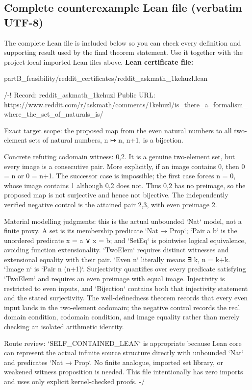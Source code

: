 \documentclass[11pt]{article}
\begin{document}
\subsection*{Complete counterexample Lean file (verbatim UTF-8)}
The complete Lean file is included below so you can check every definition and supporting result used by the final theorem statement. Use it together with the project-local imported Lean files above.
\textbf{Lean certificate file:}
\begin{Vsrc}
partB_feasibility/reddit_certificates/reddit_askmath_1kehuzl.lean
\end{Vsrc}
\begin{Vlean}
/-!
Record: reddit_askmath_1kehuzl
Public URL:
https://www.reddit.com/r/askmath/comments/1kehuzl/is_there_a_formalism_where_the_set_of_naturals_is/

Exact target scope: the proposed map from the even natural numbers to all
two-element sets of natural numbers, n ↦ {n, n+1}, is a bijection.

Concrete refuting codomain witness: {0,2}.  It is a genuine two-element set,
but every image is a consecutive pair.  More explicitly, if an image contains
0, then 0 = n or 0 = n+1.  The successor case is impossible; the first case
forces n = 0, whose image contains 1 although {0,2} does not.  Thus {0,2} has
no preimage, so the proposed map is not surjective and hence not bijective.
The independently verified negative control is the attained pair {2,3}, with
even preimage 2.

Material modelling judgments: this is the actual unbounded `Nat` model, not a
finite proxy.  A set is its membership predicate `Nat → Prop`; `Pair a b`
is the unordered predicate x = a ∨ x = b; and `SetEq` is pointwise logical
equivalence, avoiding function extensionality.  `TwoElem` requires distinct
witnesses and extensional equality with their pair.  `Even n` literally means
∃ k, n = k+k.  `Image n` is `Pair n (n+1)`.  Surjectivity quantifies over
every predicate satisfying `TwoElem` and requires an even preimage with equal
image.  Injectivity is restricted to even inputs, and `Bijection` contains both
that injectivity statement and the stated surjectivity.  The well-definedness
theorem records that every even input lands in the two-element codomain; the
negative control records the real domain condition, codomain condition, and
image equality rather than merely checking an isolated arithmetic identity.

Route review: `SELF_CONTAINED_LEAN` is appropriate because Lean core can
represent the actual infinite source structure directly with unbounded `Nat`
and predicates `Nat → Prop`.  No finite analogue, imported set library, or
weakened witness proposition is needed.  This file intentionally has zero
imports and uses only explicit kernel-checked proofs.
-/


\end{Vlean}
\end{document}
